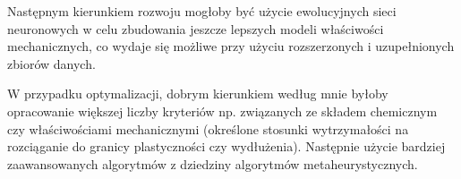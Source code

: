 Następnym kierunkiem rozwoju mogłoby być użycie ewolucyjnych sieci neuronowych w celu zbudowania jeszcze lepszych modeli właściwości mechanicznych, co wydaje się możliwe przy użyciu rozszerzonych i uzupełnionych zbiorów danych.

W przypadku optymalizacji, dobrym kierunkiem według mnie byłoby opracowanie większej liczby kryteriów np. związanych ze składem chemicznym czy właściwościami mechanicznymi (określone stosunki wytrzymałości na rozciąganie do granicy plastyczności czy wydłużenia). Następnie użycie bardziej zaawansowanych algorytmów z dziedziny algorytmów metaheurystycznych.

